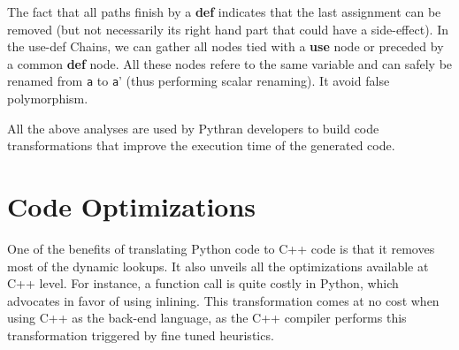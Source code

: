 \documentclass[10pt, onecolumn, preprint]{sigplanconf}
\begin{document}
\begin{center}
\end{center}

The fact that all paths finish by a \textbf{def} indicates that the last
assignment can be removed (but not necessarily its right hand part that could
have a side-effect). %
In the use-def Chains, we can gather all nodes tied with a \textbf{use} node or
preceded by a common \textbf{def} node.
All these nodes refere to the same variable and can
safely be renamed from \texttt{a} to \texttt{a}' (thus performing scalar
renaming). It avoid false polymorphism.

All the above analyses are used by Pythran developers to build code
transformations that improve the execution time of the generated code.

\section{Code Optimizations}
\label{sec:optimizations}

One of the benefits of translating Python code to C++ code is that it removes
most of the dynamic lookups. It also unveils all the optimizations available at
C++ level. For instance, a function call is quite costly in Python, which
advocates in favor of using inlining. This transformation comes at no cost when
using C++ as the back-end language, as the C++ compiler performs this 
transformation triggered by fine tuned heuristics.
\end{document}
